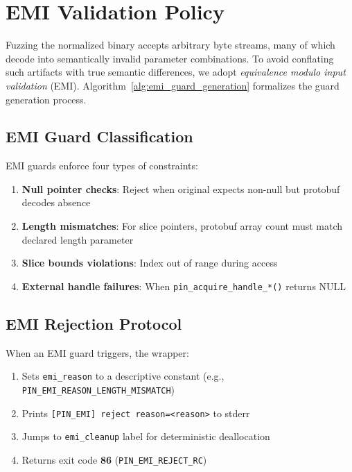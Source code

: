 \documentclass[doublespace,nopageskip]{VTthesis}
\begin{document}
  \section{EMI Validation Policy} \label{se:emi_policy_detailed}

  Fuzzing the normalized binary accepts arbitrary byte streams, many of which decode into semantically invalid parameter combinations. To avoid conflating such artifacts with true semantic differences, we adopt \emph{equivalence modulo input validation} (EMI). Algorithm~\ref{alg:emi_guard_generation} formalizes the guard generation process.

  

  \subsection{EMI Guard Classification}

  EMI guards enforce four types of constraints:

  \begin{enumerate}
      \item \textbf{Null pointer checks}: Reject when original expects non-null but protobuf decodes absence
      \item \textbf{Length mismatches}: For slice pointers, protobuf array count must match declared length parameter
      \item \textbf{Slice bounds violations}: Index out of range during access
      \item \textbf{External handle failures}: When \texttt{pin\_acquire\_handle\_*()} returns NULL
  \end{enumerate}

  \subsection{EMI Rejection Protocol}

  When an EMI guard triggers, the wrapper:
  \begin{enumerate}
      \item Sets \texttt{emi\_reason} to a descriptive constant (e.g., \texttt{PIN\_EMI\_REASON\_LENGTH\_MISMATCH})
      \item Prints \texttt{[PIN\_EMI] reject reason=<reason>} to stderr
      \item Jumps to \texttt{emi\_cleanup} label for deterministic deallocation
      \item Returns exit code \textbf{86} (\texttt{PIN\_EMI\_REJECT\_RC})
  \end{enumerate}
\end{document}
